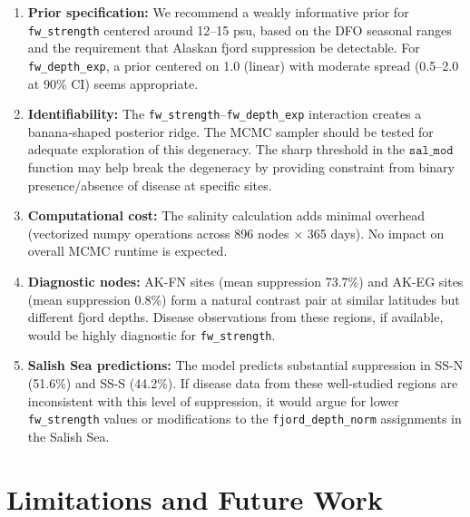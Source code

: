 \documentclass[11pt,a4paper]{article}
\begin{document}
\begin{enumerate}
    \item \textbf{Prior specification:} We recommend a weakly informative prior for \texttt{fw\_strength} centered around 12--15 psu, based on the DFO seasonal ranges and the requirement that Alaskan fjord suppression be detectable. For \texttt{fw\_depth\_exp}, a prior centered on 1.0 (linear) with moderate spread (0.5--2.0 at 90\% CI) seems appropriate.

    \item \textbf{Identifiability:} The \texttt{fw\_strength}--\texttt{fw\_depth\_exp} interaction creates a banana-shaped posterior ridge. The MCMC sampler should be tested for adequate exploration of this degeneracy. The sharp threshold in the $\texttt{sal\_mod}$ function may help break the degeneracy by providing constraint from binary presence/absence of disease at specific sites.

    \item \textbf{Computational cost:} The salinity calculation adds minimal overhead (vectorized numpy operations across 896 nodes $\times$ 365 days). No impact on overall MCMC runtime is expected.

    \item \textbf{Diagnostic nodes:} AK-FN sites (mean suppression 73.7\%) and AK-EG sites (mean suppression 0.8\%) form a natural contrast pair at similar latitudes but different fjord depths. Disease observations from these regions, if available, would be highly diagnostic for \texttt{fw\_strength}.

    \item \textbf{Salish Sea predictions:} The model predicts substantial suppression in SS-N (51.6\%) and SS-S (44.2\%). If disease data from these well-studied regions are inconsistent with this level of suppression, it would argue for lower \texttt{fw\_strength} values or modifications to the \texttt{fjord\_depth\_norm} assignments in the Salish Sea.
\end{enumerate}

\section{Limitations and Future Work}
\label{sec:limitations}
\end{document}
